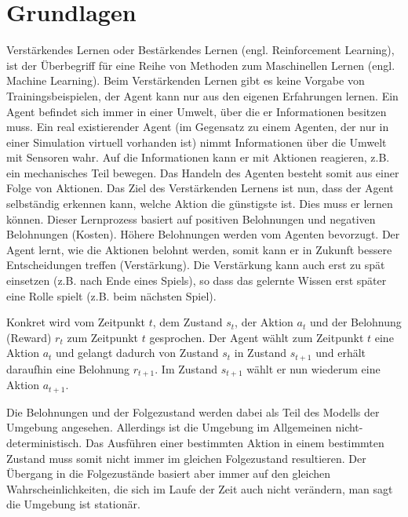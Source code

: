 \documentclass[10pt]{scrartcl}
\author{Steffen Brauer, André Harms,\\ Florian Johannßen, Jan-Christoph Meier,\\ Florian Ocker, Olaf Potratz,\\ Torben Woggan}
\title{\titletext}
\date{10.06.2012}
\begin{document}
\maketitle

\setcounter{tocdepth}{3}
\tableofcontents

	\listoffigures  
\newpage
\section{Grundlagen}
Verstärkendes Lernen oder Bestärkendes Lernen (engl. Reinforcement Learning), ist der Überbegriff für eine Reihe von Methoden zum Maschinellen Lernen (engl. Machine Learning). Beim Verstärkenden Lernen gibt es keine Vorgabe von Trainingsbeispielen, der Agent kann nur aus den eigenen Erfahrungen lernen. Ein Agent befindet sich immer in einer Umwelt, über die er Informationen besitzen muss. Ein real existierender Agent (im Gegensatz zu einem Agenten, der nur in einer Simulation virtuell vorhanden ist) nimmt Informationen über die Umwelt mit Sensoren wahr. Auf die Informationen kann er mit Aktionen reagieren, z.B. ein mechanisches Teil bewegen. Das Handeln des Agenten besteht somit aus einer Folge von Aktionen. Das Ziel des Verstärkenden Lernens ist nun, dass der Agent selbständig erkennen kann, welche Aktion die günstigste ist. Dies muss er lernen können. Dieser Lernprozess basiert auf positiven Belohnungen und negativen Belohnungen (Kosten). Höhere Belohnungen werden vom Agenten bevorzugt. Der Agent lernt, wie die Aktionen belohnt werden, somit kann er in Zukunft bessere Entscheidungen treffen (Verstärkung). Die Verstärkung kann auch erst zu spät einsetzen (z.B. nach Ende eines Spiels), so dass das gelernte Wissen erst später eine Rolle spielt (z.B. beim nächsten Spiel).

Konkret wird vom Zeitpunkt $t$, dem Zustand $s_t$, der Aktion $a_t$ und der Belohnung (Reward) $r_t$ zum Zeitpunkt $t$ gesprochen. Der Agent wählt zum Zeitpunkt $t$ eine Aktion $a_t$ und gelangt dadurch von Zustand $s_t$ in Zustand $s_{t+1}$ und erhält daraufhin eine Belohnung $r_{t+1}$. Im Zustand $s_{t+1}$ wählt er nun wiederum eine Aktion $a_{t+1}$.

Die Belohnungen und der Folgezustand werden dabei als Teil des Modells der Umgebung angesehen. Allerdings ist die Umgebung im Allgemeinen nicht-deterministisch. Das Ausführen einer bestimmten Aktion in einem bestimmten Zustand muss somit nicht immer im gleichen Folgezustand resultieren. Der Übergang in die Folgezustände basiert aber immer auf den gleichen Wahrscheinlichkeiten, die sich im Laufe der Zeit auch nicht verändern, man sagt die Umgebung ist stationär.
\end{document}
